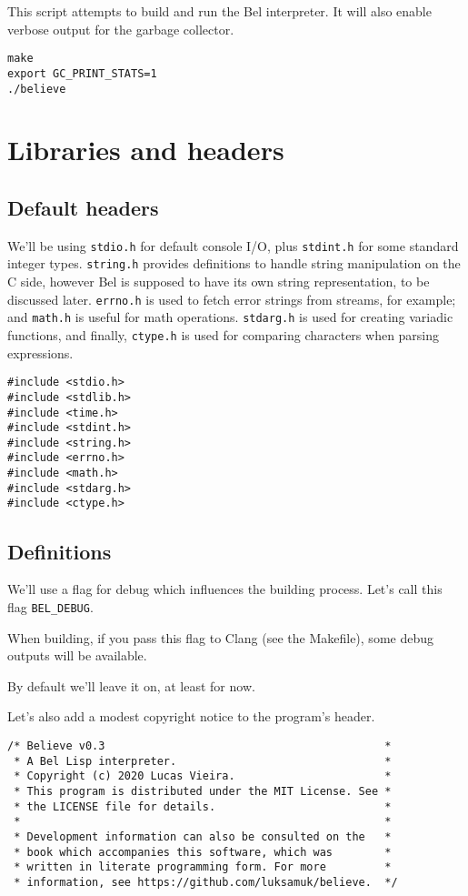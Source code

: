 \documentclass[openright,a4paper,twoside,12pt]{memoir}
\begin{document}
This script attempts to build and run the Bel interpreter. It will
also enable verbose output for the garbage collector.

\begin{verbatim}
make
export GC_PRINT_STATS=1
./believe
\end{verbatim}

\chapter{Libraries and headers}
\label{sec:org415d5bb}

\section{Default headers}
\label{sec:orgb335029}

We'll be using \texttt{stdio.h} for default console I/O, plus \texttt{stdint.h} for some
standard integer types. \texttt{string.h} provides definitions to handle string
manipulation on the C side, however Bel is supposed to have its own
string representation, to be discussed later. \texttt{errno.h} is used to fetch
error strings from streams, for example; and \texttt{math.h} is useful for math
operations.  \texttt{stdarg.h} is  used  for creating  variadic functions,  and
finally,  \texttt{ctype.h}  is  used  for  comparing  characters  when  parsing
expressions.

\begin{verbatim}
#include <stdio.h>
#include <stdlib.h>
#include <time.h>
#include <stdint.h>
#include <string.h>
#include <errno.h>
#include <math.h>
#include <stdarg.h>
#include <ctype.h>
\end{verbatim}

\section{Definitions}
\label{sec:org4eb9e8e}

We'll use a flag for debug which influences the building
process. Let's call this flag \texttt{BEL\_DEBUG}.

When building, if you pass this flag to Clang (see the Makefile), some
debug outputs will be available.

By default we'll leave it on, at least for now.

Let's also add a modest copyright notice to the program's header.

\begin{verbatim}
/* Believe v0.3                                           *
 * A Bel Lisp interpreter.                                *
 * Copyright (c) 2020 Lucas Vieira.                       *
 * This program is distributed under the MIT License. See *
 * the LICENSE file for details.                          *
 *                                                        *
 * Development information can also be consulted on the   *
 * book which accompanies this software, which was        * 
 * written in literate programming form. For more         *
 * information, see https://github.com/luksamuk/believe.  */
\end{verbatim}
\end{document}
